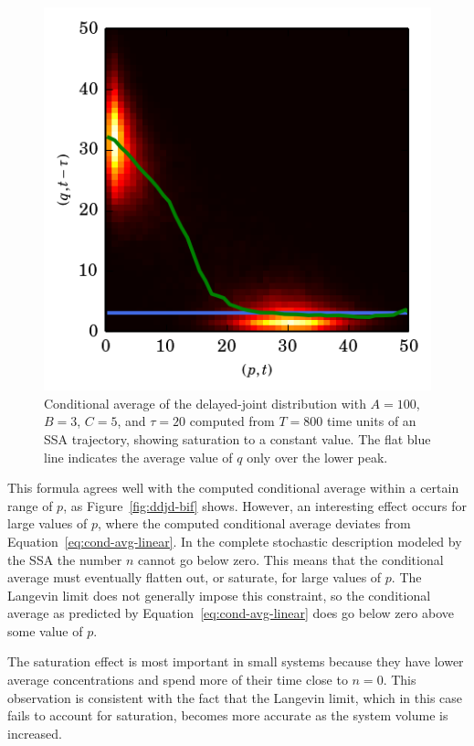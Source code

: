\documentclass[english,letterpaper,12pt]{report}
\begin{document}
\begin{doublespacing}
\begin{figure}[tb]
    \begin{center}
        \includegraphics{../results/thesis/ddjd-ca-a100-c5-t20.png}
    \end{center}
    \caption{Conditional average of the delayed-joint distribution with $A=100$, $B=3$, $C=5$, and $\tau=20$ computed from $T=800$ time units of an SSA trajectory, showing saturation to a constant value. The flat blue line indicates the average value of $q$ only over the lower peak.}
    \label{fig:ddjd-osc-sat}
\end{figure}

This formula agrees well with the computed conditional average within a certain range of $p$, as Figure~\ref{fig:ddjd-bif} shows. However, an interesting effect occurs for large values of $p$, where the computed conditional average deviates from Equation~\ref{eq:cond-avg-linear}. In the complete stochastic description modeled by the SSA the number $n$ cannot go below zero. This means that the conditional average must eventually flatten out, or saturate, for large values of $p$. The Langevin limit does not generally impose this constraint, so the conditional average as predicted by Equation~\eqref{eq:cond-avg-linear} does go below zero above some value of $p$.

The saturation effect is most important in small systems because they have lower average concentrations and spend more of their time close to $n=0$. This observation is consistent with the fact that the Langevin limit, which in this case fails to account for saturation, becomes more accurate as the system volume is increased.


\end{doublespacing}
\end{document}
